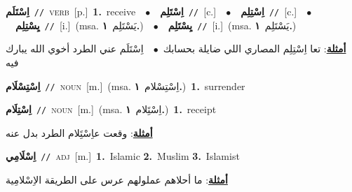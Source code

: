 \documentclass[10pt,a4paper,twoside]{article} %
\begin{document}
\begin{multicols}{2}
{\setlength\topsep{0pt}\textbf{\foreignlanguage{arabic}{اِسْتَلَم}}\ {\color{gray}\texttt{//}\color{black}}\ \textsc{verb}\ [p.]\ \textbf{1.}~receive\ \ $\bullet$\ \ \setlength\topsep{0pt}\textbf{\foreignlanguage{arabic}{اِسْتَلِم}}\ {\color{gray}\texttt{//}\color{black}}\ [c.]\ \ $\bullet$\ \ \setlength\topsep{0pt}\textbf{\foreignlanguage{arabic}{اِسْتِلِم}}\ {\color{gray}\texttt{//}\color{black}}\ [c.]\ \ $\bullet$\ \ \setlength\topsep{0pt}\textbf{\foreignlanguage{arabic}{يِسْتِلِم}}\ {\color{gray}\texttt{//}\color{black}}\ [i.]\ \color{gray}(msa. \foreignlanguage{arabic}{يَسْتَلِم}~\foreignlanguage{arabic}{\textbf{١.}})\color{black}\ \ $\bullet$\ \ \setlength\topsep{0pt}\textbf{\foreignlanguage{arabic}{يِسْتَلِم}}\ {\color{gray}\texttt{//}\color{black}}\ [i.]\ \color{gray}(msa. \foreignlanguage{arabic}{يَسْتَلِم}~\foreignlanguage{arabic}{\textbf{١.}})\color{black}\  \begin{flushright}\color{gray}\foreignlanguage{arabic}{\textbf{\underline{\foreignlanguage{arabic}{أمثلة}}}: تعا اِسْتِلِم المصاري اللي ضايلة بحسابك\ $\bullet$\ \  اِسْتَلَم عني الطرد أخوي الله يبارك فيه}\end{flushright}\color{black}} \vspace{2mm}

{\setlength\topsep{0pt}\textbf{\foreignlanguage{arabic}{اِسْتِسْلَام}}\ {\color{gray}\texttt{//}\color{black}}\ \textsc{noun}\ [m.]\ \color{gray}(msa. \foreignlanguage{arabic}{اِسْتِسْلام}~\foreignlanguage{arabic}{\textbf{١.}})\color{black}\ \textbf{1.}~surrender\ } \vspace{2mm}

{\setlength\topsep{0pt}\textbf{\foreignlanguage{arabic}{اِسْتِلَام}}\ {\color{gray}\texttt{//}\color{black}}\ \textsc{noun}\ [m.]\ \color{gray}(msa. \foreignlanguage{arabic}{اِسْتَِلام}~\foreignlanguage{arabic}{\textbf{١.}})\color{black}\ \textbf{1.}~receipt\  \begin{flushright}\color{gray}\foreignlanguage{arabic}{\textbf{\underline{\foreignlanguage{arabic}{أمثلة}}}: وقعت عاِسْتَِلام الطرد بدل عنه}\end{flushright}\color{black}} \vspace{2mm}

{\setlength\topsep{0pt}\textbf{\foreignlanguage{arabic}{اِسْلَامِي}}\ {\color{gray}\texttt{//}\color{black}}\ \textsc{adj}\ [m.]\ \textbf{1.}~Islamic  \textbf{2.}~Muslim  \textbf{3.}~Islamist\  \begin{flushright}\color{gray}\foreignlanguage{arabic}{\textbf{\underline{\foreignlanguage{arabic}{أمثلة}}}: ما أحلاهم عملولهم عرس على الطريقة الاِسْلامِية}\end{flushright}\color{black}} \vspace{2mm}


\end{multicols}
\end{document}
